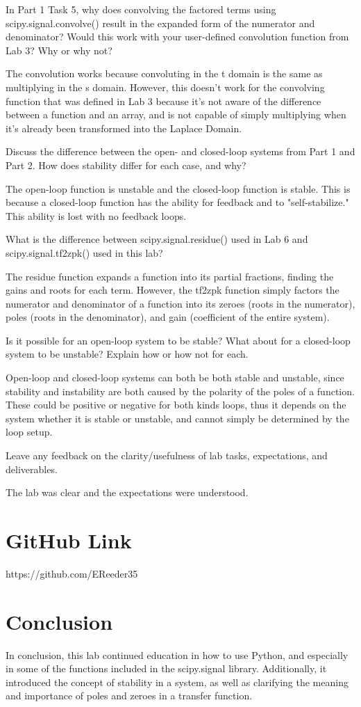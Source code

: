 \documentclass[12pt]{article}
\begin{document}
In Part 1 Task 5, why does convolving the factored terms using scipy.signal.convolve() result in the expanded form of the numerator and denominator?  Would this work with your user-defined convolution function from Lab 3?  Why or why not?

The convolution works because convoluting in the t domain is the same as multiplying in the s domain. However, this doesn't work for the convolving function that was defined in Lab 3 because it's not aware of the difference between a function and an array, and is not capable of simply multiplying when it's already been transformed into the Laplace Domain.

Discuss the difference between the open- and closed-loop systems from Part 1 and Part 2. How does stability differ for each case, and why?

The open-loop function is unstable and the closed-loop function is stable. This is because a closed-loop function has the ability for feedback and to "self-stabilize." This ability is lost with no feedback loops.

What is the difference between scipy.signal.residue() used in Lab 6 and scipy.signal.tf2zpk() used in this lab?

The residue function expands a function into its partial fractions, finding the gains and roots for each term. However, the tf2zpk function simply factors the numerator and denominator of a function into its zeroes (roots in the numerator), poles (roots in the denominator), and gain (coefficient of the entire system).

Is it possible for an open-loop system to be stable?  What about for a closed-loop system to be unstable?  Explain how or how not for each.

Open-loop and closed-loop systems can both be both stable and unstable, since stability and instability are both caused by the polarity of the poles of a function. These could be positive or negative for both kinds loops, thus it depends on the system whether it is stable or unstable, and cannot simply be determined by the loop setup.

Leave any feedback on the clarity/usefulness of lab tasks, expectations, and deliverables.

The lab was clear and the expectations were understood.

\section{GitHub Link}

https://github.com/EReeder35

\section{Conclusion}

In conclusion, this lab continued education in how to use Python, and especially in some of the functions included in the scipy.signal library. Additionally, it introduced the concept of stability in a system, as well as clarifying the meaning and importance of poles and zeroes in a transfer function.
\end{document}
